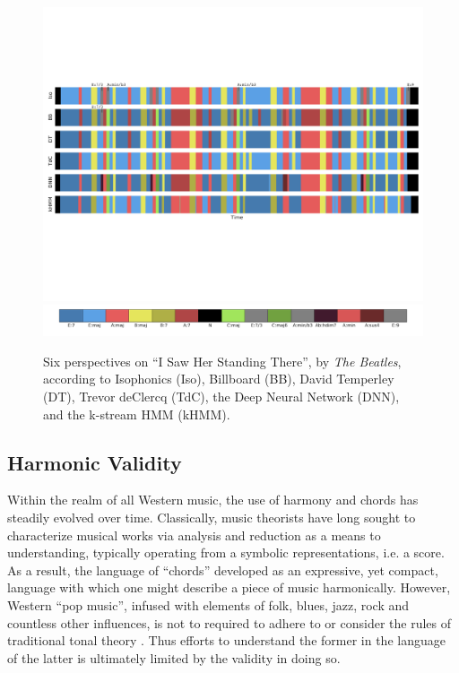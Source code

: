 \documentclass{article}
\begin{document}
\begin{figure}[t]
\centering
\includegraphics[width=\textwidth]{TROSSUK149E3AE03BD_annotations_mkup2}
\includegraphics[width=\textwidth]{TROSSUK149E3AE03BD_legend}
\caption{Six perspectives on ``I Saw Her Standing There'', by \emph{The Beatles}, according to Isophonics (Iso), Billboard (BB), David Temperley (DT), Trevor deClercq (TdC), the Deep Neural Network (DNN), and the k-stream HMM (kHMM).}
\label{fig:beatles}
\end{figure}

\subsection{Harmonic Validity}
\label{subsec:validity}

Within the realm of all Western music, the use of harmony and chords has steadily evolved over time.
Classically, music theorists have long sought to characterize musical works via analysis and reduction as a means to understanding, typically operating from a symbolic representations, i.e. a score.
As a result, the language of ``chords'' developed as an expressive, yet compact, language with which one might describe a piece of music harmonically.
However, Western ``pop music'', infused with elements of folk, blues, jazz, rock and countless other influences, is not to required to adhere to or consider the rules of traditional tonal theory \cite{Tagg1982Analysing}.
Thus efforts to understand the former in the language of the latter is ultimately limited by the validity in doing so.
\end{document}
